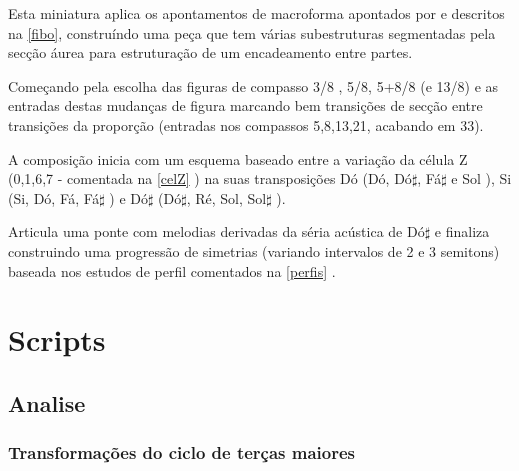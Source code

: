 \documentclass[
	12pt,				%
	openright,			%
	twoside,			%
	a4paper,			%
	english,			%
	french,				%
	spanish,			%
	brazil				%
	]{abntex2}
\begin{document}
Esta miniatura aplica os apontamentos de macroforma apontados por  e descritos na \autoref{fibo}, construíndo uma peça que tem várias subestruturas segmentadas pela secção áurea para estruturação de um encadeamento entre partes. 

Começando pela escolha das figuras de compasso 3/8 , 5/8, 5+8/8 (e 13/8) e as entradas destas mudanças de figura marcando bem transições de secção entre transições da proporção (entradas nos compassos 5,8,13,21, acabando em 33).

A composição inicia com um esquema baseado entre a variação da célula Z (0,1,6,7 - comentada na \autoref{celZ} ) na suas transposições Dó (Dó, Dó$\sharp$, Fá$\sharp $ e Sol ), Si (Si, Dó, Fá, Fá$\sharp $ ) e Dó$\sharp$ (Dó$\sharp$, Ré, Sol, Sol$\sharp$ ). 

Articula uma ponte com melodias derivadas da séria acústica de Dó$\sharp$ e finaliza construindo uma progressão de simetrias (variando intervalos de 2 e 3 semitons) baseada nos estudos de perfil comentados na \autoref{perfis} .




\chapter{Scripts}
\label{scripts}

\section{Analise}

\subsection{Transformações do ciclo de terças maiores}
\label{ciclotercas}
\end{document}
